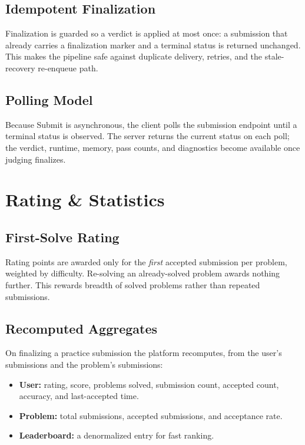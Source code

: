 \documentclass[12pt,a4paper,oneside]{report}
\begin{document}
\section{Idempotent Finalization}
Finalization is guarded so a verdict is applied at most once: a submission that
already carries a finalization marker and a terminal status is returned
unchanged. This makes the pipeline safe against duplicate delivery, retries, and
the stale-recovery re-enqueue path.

\section{Polling Model}
Because Submit is asynchronous, the client polls the submission endpoint until a
terminal status is observed. The server returns the current status on each poll;
the verdict, runtime, memory, pass counts, and diagnostics become available once
judging finalizes.

\chapter{Rating \& Statistics}
\section{First-Solve Rating}
Rating points are awarded only for the \emph{first} accepted submission per
problem, weighted by difficulty. Re-solving an already-solved problem awards
nothing further. This rewards breadth of solved problems rather than repeated
submissions.

\section{Recomputed Aggregates}
On finalizing a practice submission the platform recomputes, from the user's
submissions and the problem's submissions:
\begin{itemize}[leftmargin=1.5em]
  \item \textbf{User:} rating, score, problems solved, submission count, accepted
        count, accuracy, and last-accepted time.
  \item \textbf{Problem:} total submissions, accepted submissions, and acceptance
        rate.
  \item \textbf{Leaderboard:} a denormalized entry for fast ranking.
\end{itemize}
\end{document}
